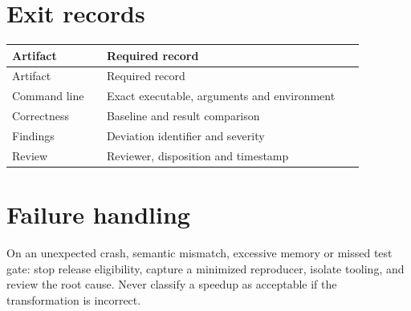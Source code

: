 \documentclass[10pt,letterpaper]{article}
\begin{document}
\section{Exit records}
\begin{longtable}{|p{0.25\linewidth}|p{0.68\linewidth}|}
\hline
Artifact & Required record\\ \hline\endfirsthead
\hline
Artifact & Required record\\ \hline\endhead
Command line & Exact executable, arguments and environment\\ \hline
Correctness & Baseline and result comparison\\ \hline
Findings & Deviation identifier and severity\\ \hline
Review & Reviewer, disposition and timestamp\\ \hline
\end{longtable}

\section{Failure handling}
On an unexpected crash, semantic mismatch, excessive memory or missed test gate: stop release eligibility, capture a minimized reproducer, isolate tooling, and review the root cause. Never classify a speedup as acceptable if the transformation is incorrect.
\end{document}

